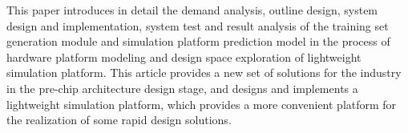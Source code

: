 \begin{abstract*}
  This paper introduces in detail the demand analysis, outline design, system design and implementation, system test and result analysis of the training set generation module and simulation platform prediction model in the process of hardware platform modeling and design space exploration of lightweight simulation platform. This 
  article provides a new set of solutions for the industry in the pre-chip architecture design stage, and designs and implements 
  a lightweight simulation platform, which provides a more convenient platform for the realization of some rapid design solutions.

\end{abstract*}
